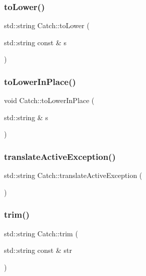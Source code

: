 \subsubsection{\texorpdfstring{to\+Lower()}{toLower()}}
{\footnotesize\ttfamily std\+::string Catch\+::to\+Lower (\begin{DoxyParamCaption}\item[{std\+::string const \&}]{s }\end{DoxyParamCaption})}

\mbox{\label{namespace_catch_a0760dbe87d090a55a35414db57d272c4}} 
\subsubsection{\texorpdfstring{to\+Lower\+In\+Place()}{toLowerInPlace()}}
{\footnotesize\ttfamily void Catch\+::to\+Lower\+In\+Place (\begin{DoxyParamCaption}\item[{std\+::string \&}]{s }\end{DoxyParamCaption})}

\mbox{\label{namespace_catch_adafff91485eeeeb9e9333f317cc0e3b1}} 
\subsubsection{\texorpdfstring{translate\+Active\+Exception()}{translateActiveException()}}
{\footnotesize\ttfamily std\+::string Catch\+::translate\+Active\+Exception (\begin{DoxyParamCaption}{ }\end{DoxyParamCaption})}

\mbox{\label{namespace_catch_a084108b47f37d8bfd5db51c50c7451b3}} 
\subsubsection{\texorpdfstring{trim()}{trim()}\hspace{0.1cm}{\footnotesize\ttfamily [1/2]}}
{\footnotesize\ttfamily std\+::string Catch\+::trim (\begin{DoxyParamCaption}\item[{std\+::string const \&}]{str }\end{DoxyParamCaption})}



